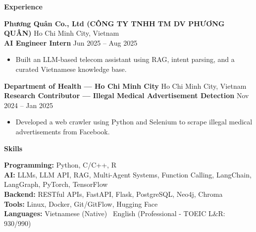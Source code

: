 \documentclass[10pt]{article}
\newcommand{\sep}{\textbullet\ }
\newcommand{\resumeSection}[1]{%
  \par\vspace{13pt}%
  {\centering\textbf{\large #1}\par}%
  \vspace{6pt}%
}
\newcommand{\resumeSubheading}[4]{%
  \textbf{#1} \hfill #2\\
  \textbf{#3} \hfill #4%
}
\newcommand{\entrygap}{\vspace{10pt}}
\begin{document}
\resumeSection{Experience}

\resumeSubheading
  {Phương Quân Co., Ltd (CÔNG TY TNHH TM DV PHƯƠNG QUÂN)}{Ho Chi Minh City, Vietnam}
  {AI Engineer Intern}{Jun 2025 -- Aug 2025}
\begin{itemize}
    \item Built an LLM-based telecom assistant using RAG, intent parsing, and a curated Vietnamese knowledge base.
\end{itemize}

\entrygap

\resumeSubheading
  {Department of Health --- Ho Chi Minh City}{Ho Chi Minh City, Vietnam}
  {Research Contributor --- Illegal Medical Advertisement Detection}{Nov 2024 -- Jan 2025}
\begin{itemize}
    \item Developed a web crawler using Python and Selenium to scrape illegal medical advertisements from Facebook.
\end{itemize}

\resumeSection{Skills}

\textbf{Programming:} Python, C/C++, R\\
\textbf{AI:} LLMs, LLM API, RAG, Multi-Agent Systems, Function Calling, LangChain, LangGraph, PyTorch, TensorFlow\\
\textbf{Backend:} RESTful APIs, FastAPI, Flask, PostgreSQL, Neo4j, Chroma\\
\textbf{Tools:} Linux, Docker, Git/GitFlow, Hugging Face\\
\textbf{Languages:} Vietnamese (Native) \sep English (Professional - TOEIC L\&R: 930/990)
\end{document}
